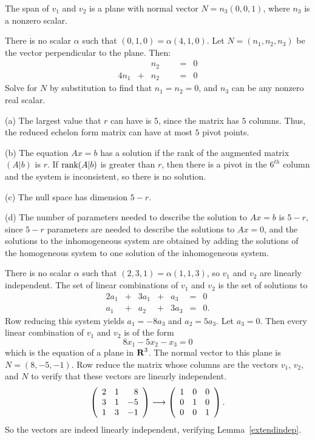 \documentclass{ximera}
\begin{document}
 \ans The span of $v_1$ and $v_2$ is a plane with normal
vector $N = n_3(0,0,1)$, where $n_3$ is a nonzero scalar.

\soln There is no scalar $\alpha$ such that $(0,1,0) = \alpha(4,1,0)$. 
Let $N = (n_1,n_2,n_3)$ be the vector perpendicular to the plane.  Then:
\[
\begin{array}{rrrrrcl}
& & n_2 & & & = & 0 \\
4n_1 & + & n_2 & & & = & 0 \end{array}
\]
Solve for $N$ by substitution to find that $n_1 = n_2 = 0$, and
$n_3$ can be any nonzero real scalar.

(a) The largest value that $r$ can have is $5$, since the matrix has
$5$ columns.  Thus, the reduced echelon form matrix can have at most
$5$ pivot points.

(b) The equation $Ax = b$ has a solution if the rank of the augmented
matrix $(A|b)$ is $r$.  If ${\rm rank} (A|b)$ is greater than $r$, then
there is a pivot in the $6^{th}$ column and the system is
inconsistent, so there is no solution.

(c) The null space has dimension $5 - r$.

(d) The number of parameters needed to describe the solution to
$Ax = b$ is $5 - r$, since $5 - r$ parameters are needed to describe
the solutions to $Ax = 0$, and the solutions to the inhomogeneous
system are obtained by adding the solutions of the homogeneous system
to one solution of the inhomogeneous system.

There is no scalar $\alpha$ such that $(2,3,1) = \alpha(1,1,3)$, so
$v_1$ and $v_2$ are linearly independent.
The set of linear combinations of $v_1$ and $v_2$ is the set of
solutions to
\[
\begin{array}{rrrrrrl}
2a_1 & + & 3a_1 & + & a_3 & = & 0 \\
a_1 & + & a_2 & + & 3a_3 & = & 0. \end{array}
\]
Row reducing this system yields $a_1 = -8a_3$ and $a_2 = 5a_3$.
Let $a_3 = 0$.  Then every linear combination of $v_1$ and $v_2$ is
of the form
\[
8x_1 - 5x_2 - x_3 = 0
\]
which is the equation of a plane in $\mbox{$\bf{R}$}^3$.  The normal vector to this
plane is $N = (8,-5,-1)$.  Row reduce the matrix whose columns
are the vectors $v_1$, $v_2$, and $N$ to verify that these vectors
are linearly independent.
\[
\left(\begin{array}{rrr} 2 & 1 & 8 \\ 3 & 1 & -5 \\ 1 & 3 & -1\end{array}\right) \longrightarrow
\left(\begin{array}{rrr} 1 & 0 & 0 \\ 0 & 1 & 0 \\ 0 & 0 & 1\end{array}\right).
\]
So the vectors are indeed linearly independent, verifying
Lemma~\ref{extendindep}.
\end{document}
